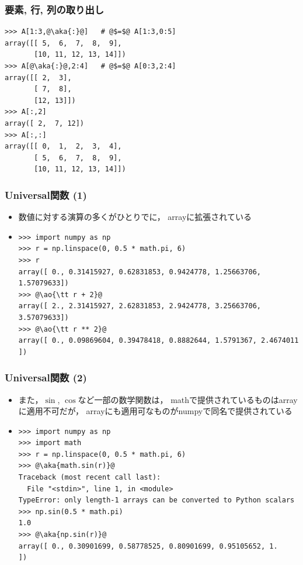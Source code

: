 \documentclass[10pt,dvipdfmx]{beamer}
\newcommand{\ao}[1]{{\color{blue}#1}}
\newcommand{\aka}[1]{{\color{red}#1}}
\begin{document}
\begin{frame}[fragile]
\frametitle{要素, 行, 列の取り出し}
\begin{lstlisting}
>>> A[1:3,@\aka{:}@]   # @$=$@ A[1:3,0:5]
array([[ 5,  6,  7,  8,  9],
       [10, 11, 12, 13, 14]])
>>> A[@\aka{:}@,2:4]   # @$=$@ A[0:3,2:4]
array([[ 2,  3],
       [ 7,  8],
       [12, 13]])
>>> A[:,2]
array([ 2,  7, 12])
>>> A[:,:]
array([[ 0,  1,  2,  3,  4],
       [ 5,  6,  7,  8,  9],
       [10, 11, 12, 13, 14]])
\end{lstlisting}
\end{frame}


\begin{frame}[fragile]
\frametitle{Universal関数 (1)}
\begin{itemize}
\item 数値に対する演算の多くがひとりでに，
  arrayに拡張されている
\item 
{\small
\begin{lstlisting}
>>> import numpy as np
>>> r = np.linspace(0, 0.5 * math.pi, 6)
>>> r
array([ 0., 0.31415927, 0.62831853, 0.9424778, 1.25663706, 1.57079633])
>>> @\ao{\tt r + 2}@
array([ 2., 2.31415927, 2.62831853, 2.9424778, 3.25663706, 3.57079633])
>>> @\ao{\tt r ** 2}@
array([ 0., 0.09869604, 0.39478418, 0.8882644, 1.5791367, 2.4674011 ])
\end{lstlisting}}
\end{itemize}
\end{frame}

\begin{frame}[fragile]
\frametitle{Universal関数 (2)}
\begin{itemize}
\item また，$\sin$, $\cos$など一部の数学関数は，
mathで提供されているものはarrayに適用不可だが，
arrayにも適用可なものがnumpyで同名で提供されている

\item 
{\small
\begin{lstlisting}
>>> import numpy as np
>>> import math
>>> r = np.linspace(0, 0.5 * math.pi, 6)
>>> @\aka{math.sin(r)}@
Traceback (most recent call last):
  File "<stdin>", line 1, in <module>
TypeError: only length-1 arrays can be converted to Python scalars
>>> np.sin(0.5 * math.pi)
1.0
>>> @\aka{np.sin(r)}@
array([ 0., 0.30901699, 0.58778525, 0.80901699, 0.95105652, 1.        ])
\end{lstlisting}}
\end{itemize}
\end{frame}
\end{document}
